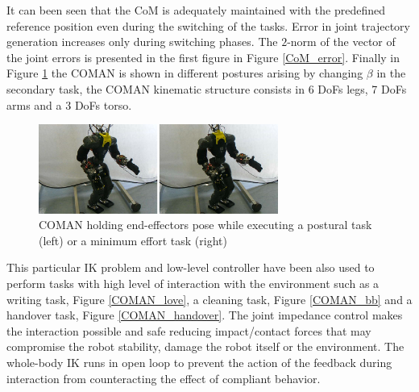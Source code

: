 It can been seen that the CoM is adequately maintained with the predefined reference position even during the switching of the tasks. 
Error in joint trajectory generation increases only during switching phases. The $2$-norm of the vector of the joint errors is presented in the first figure in Figure \ref{CoM_error}.
Finally in Figure \ref{COMAN_exp} the COMAN is shown in different postures arising by changing $\beta$ in the secondary task, the COMAN kinematic structure consists in 6 DoFs legs, 7 DoFs arms and a 3 DoFs torso.
\begin{figure}
        \centering
        \vspace{2mm}
        \includegraphics[width=0.7\textwidth]{images/soft_interaction/postural_min_effort.png}
        \caption{COMAN holding end-effectors pose while executing a postural task (left) or a minimum effort task (right)}
        \label{COMAN_exp}
\end{figure}
This particular IK problem and low-level controller have been also used to perform tasks with high level of interaction with the environment such as a writing task, Figure \ref{COMAN_love}, a cleaning task, Figure \ref{COMAN_bb} and a handover task, Figure \ref{COMAN_handover}. The joint impedance control makes the interaction possible and safe reducing impact/contact forces that may compromise the robot stability, damage the robot itself or the environment. The whole-body IK runs in open loop to prevent the action of the feedback during interaction from counteracting the effect of compliant behavior.

